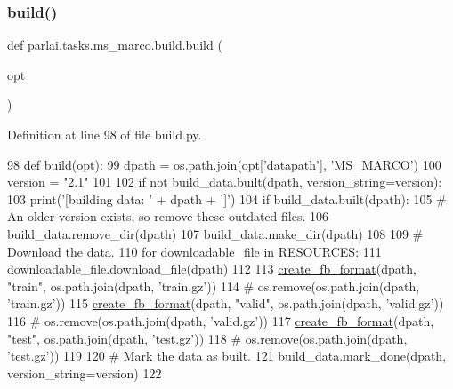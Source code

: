 \subsubsection{\texorpdfstring{build()}{build()}}
{\footnotesize\ttfamily def parlai.\+tasks.\+ms\+\_\+marco.\+build.\+build (\begin{DoxyParamCaption}\item[{}]{opt }\end{DoxyParamCaption})}



Definition at line 98 of file build.\+py.


\begin{DoxyCode}
98 \textcolor{keyword}{def }\hyperlink{namespacedialog__babi__feedback_1_1build_a7a9d289f7493a5ded13c4b7f071b6184}{build}(opt):
99     dpath = os.path.join(opt[\textcolor{stringliteral}{'datapath'}], \textcolor{stringliteral}{'MS\_MARCO'})
100     version = \textcolor{stringliteral}{"2.1"}
101 
102     \textcolor{keywordflow}{if} \textcolor{keywordflow}{not} build\_data.built(dpath, version\_string=version):
103         print(\textcolor{stringliteral}{'[building data: '} + dpath + \textcolor{stringliteral}{']'})
104         \textcolor{keywordflow}{if} build\_data.built(dpath):
105             \textcolor{comment}{# An older version exists, so remove these outdated files.}
106             build\_data.remove\_dir(dpath)
107         build\_data.make\_dir(dpath)
108 
109         \textcolor{comment}{# Download the data.}
110         \textcolor{keywordflow}{for} downloadable\_file \textcolor{keywordflow}{in} RESOURCES:
111             downloadable\_file.download\_file(dpath)
112 
113         \hyperlink{namespaceparlai_1_1tasks_1_1wikiqa_1_1build_a554828702769592403db58c955d1dfe3}{create\_fb\_format}(dpath, \textcolor{stringliteral}{"train"}, os.path.join(dpath, \textcolor{stringliteral}{'train.gz'}))
114         \textcolor{comment}{# os.remove(os.path.join(dpath, 'train.gz'))}
115         \hyperlink{namespaceparlai_1_1tasks_1_1wikiqa_1_1build_a554828702769592403db58c955d1dfe3}{create\_fb\_format}(dpath, \textcolor{stringliteral}{"valid"}, os.path.join(dpath, \textcolor{stringliteral}{'valid.gz'}))
116         \textcolor{comment}{# os.remove(os.path.join(dpath, 'valid.gz'))}
117         \hyperlink{namespaceparlai_1_1tasks_1_1wikiqa_1_1build_a554828702769592403db58c955d1dfe3}{create\_fb\_format}(dpath, \textcolor{stringliteral}{"test"}, os.path.join(dpath, \textcolor{stringliteral}{'test.gz'}))
118         \textcolor{comment}{# os.remove(os.path.join(dpath, 'test.gz'))}
119 
120         \textcolor{comment}{# Mark the data as built.}
121         build\_data.mark\_done(dpath, version\_string=version)
122 \end{DoxyCode}
\mbox{\label{namespaceparlai_1_1tasks_1_1ms__marco_1_1build_a6c94ade2f99fa70bf4103a22a1fbdc42}} 

